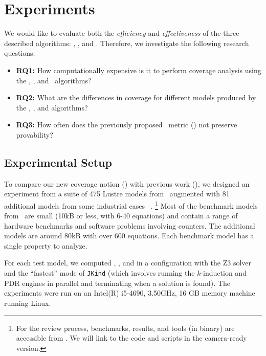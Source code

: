\section{Experiments}
\label{sec:experiments}

We would like to evaluate both the {\em efficiency} and {\em
  effectiveness} of the three described algorithms: \ucalg, \ucbfalg, and \mustalg. Therefore, we investigate the following research questions:
\begin{itemize}
    \item \textbf{RQ1:} How computationally expensive is it to perform coverage analysis using the \ucalg, \ucbfalg, and \mustalg\ algorithms?
    \item \textbf{RQ2:} What are the differences in coverage for different models produced by the \ucalg, \ucbfalg, and \mustalg algorithms?
    \item \textbf{RQ3:} How often does the previously proposed \nondetcov\ metric (\mustalg) not preserve provability?
\end{itemize}

\subsection{Experimental Setup}

To compare our new coverage notion (\ivccov) with previous work (\nondetcovalt), we designed an experiment from a suite of 475 Lustre models from~\cite{Hagen08:FMCAD} augmented
with 81 additional models from some industrial cases ~\cite{QFCS15:backes,hilt2013}.
\footnote{For the review process, benchmarks, results, and tools (in binary) are accessible from \cite{anoexpr}. We will link to the code and scripts in the camera-ready version.}
Most of
the benchmark models from~\cite{Hagen08:FMCAD} are small (10kB or less,
with 6-40 equations) and contain a range of hardware benchmarks and
software problems involving counters. The additional models are around 80kB with over 600 equations. Each benchmark model has a single property to analyze.

For each test model, we computed \ucalg, \ucbfalg, and \mustalg in a configuration with
the Z3 solver and the ``fastest'' mode of \texttt{JKind} (which involves running the $k$-induction and PDR engines
in parallel and terminating when a solution is found). The experiments were run on an
Intel(R) i5-4690, 3.50GHz, 16 GB memory machine running Linux.




